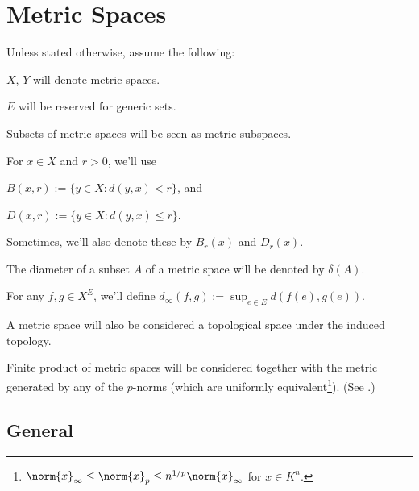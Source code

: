 %

\chapter{Metric Spaces}

\begin{conv}
	Unless stated otherwise, assume the following:
	\begin{assmplist}
		\item $X$, $Y$ will denote metric spaces.
		
		\item $E$ will be reserved for generic sets.
		
		\item Subsets of metric spaces will be seen as metric subspaces.
		
		\item For $x\in X$ and $r > 0$, we'll use
		\begin{assmplist}
			\item $B(x, r) := \{y\in X : d(y, x) < r\}$, and
			\item $D(x, r) := \{y\in X : d(y, x)\le r\}$.
		\end{assmplist}
		Sometimes, we'll also denote these by $B_r(x)$ and $D_r(x)$.
		
		\item The diameter of a subset $A$ of a metric space will be denoted by $\delta(A)$.
		
		\item For any $f, g\in X^E$, we'll define $d_\infty(f, g) := \sup_{e\in E}d(f(e), g(e))$.
		
		\item A metric space will also be considered a topological space under the induced topology.
		
		\item Finite product of metric spaces will be considered together with the metric generated by any of the $p$-norms (which are uniformly equivalent\footnote{
			$\norm{x}_\infty\le \norm{x}_p\le n^{1/p}\norm{x}_\infty$ for $x\in K^n$.
		}). (See .)
	\end{assmplist}
\end{conv}

\section{General}
	
